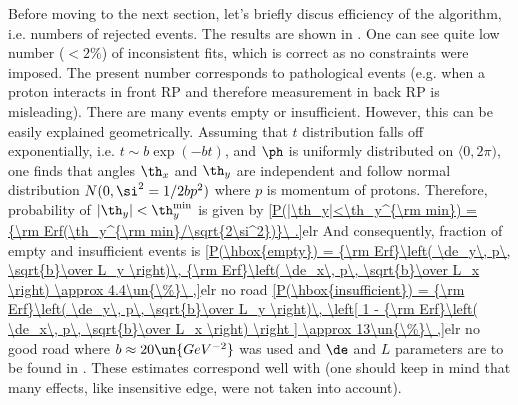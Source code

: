 \kern-8mm
\kern-8mm
\kern-8mm

Before moving to the next section, let's briefly discus efficiency of the algorithm, i.e. numbers of rejected events. The results are shown in . One can see quite low number ($< 2\%$) of inconsistent fits, which is correct as no constraints were imposed. The present number corresponds to pathological events (e.g. when a proton interacts in front RP and therefore measurement in back RP is misleading). There are many events empty or insufficient. However, this can be easily explained geometrically. Assuming that $t$ distribution falls off exponentially, i.e. $t\sim b\exp(-bt)$, and $\ph$ is uniformly distributed on $\langle 0, 2\pi)$, one finds that angles $\th_x$ and $\th_y$ are independent and follow normal distribution $N(0, \si^2 = 1/2bp^2)$ where $p$ is momentum of protons. Therefore, probability of $|\th_y|<\th_y^{\rm min}$ is given by
\eqref{P(|\th_y|<\th_y^{\rm min}) = {\rm Erf(\th_y^{\rm min}/\sqrt{2\si^2})}\ .}{elr }
And consequently, fraction of empty and insufficient events is
\eqref{P(\hbox{empty}) = {\rm Erf}\left( \de_y\, p\, \sqrt{b}\over L_y \right)\, {\rm Erf}\left( \de_x\, p\, \sqrt{b}\over L_x \right) \approx 4.4\un{\%}\ ,}{elr no road}
\eqref{P(\hbox{insufficient}) = {\rm Erf}\left( \de_y\, p\, \sqrt{b}\over L_y \right)\, \left[ 1 - {\rm Erf}\left( \de_x\, p\, \sqrt{b}\over L_x \right) \right ] \approx 13\un{\%}\ ,}{elr no good road}
where $b \approx 20\un{GeV^{-2}}$ was used and $\de$ and $L$ parameters are to be found in . These estimates correspond well with  (one should keep in mind that many effects, like insensitive edge, were not taken into account).



